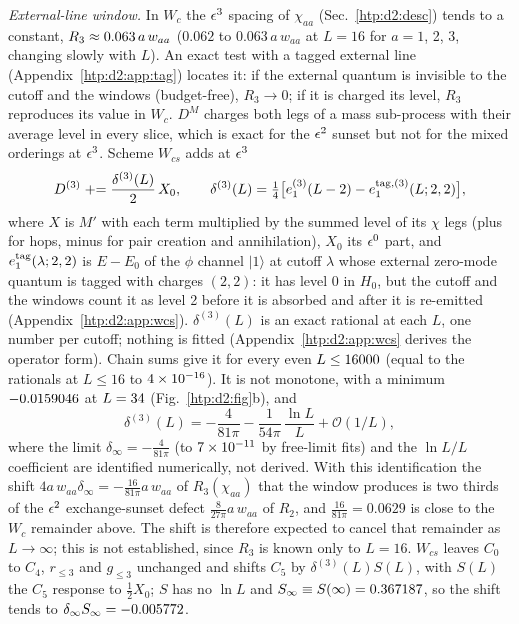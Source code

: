 \emph{External-line window.} In $W_c$ the $\epsilon^3$ spacing of $\chi_{aa}$ (Sec.~\ref{htp:d2:desc}) tends to a constant,
$R_3\approx0.063\,a\,w_{aa}$ ($0.062$ to $0.063\,a\,w_{aa}$ at $L=16$ for $a=1$, 2, 3, changing slowly with $L$). An exact test with a tagged external line (Appendix~\ref{htp:d2:app:tag}) locates it: if the external quantum is
invisible to the cutoff and the windows (budget-free), $R_3\to0$; if it is charged its level, $R_3$ reproduces its value
in $W_c$. $D^M$
charges both legs of a mass sub-process with their average level in every slice, which is exact for the $\epsilon^2$ sunset but not
for the mixed orderings at $\epsilon^3$. Scheme $W_{cs}$ adds at $\epsilon^3$
\begin{equation}
 D^{(3)}\mathrel{+}=\frac{\delta^{(3)}(L)}2\,X_0,\qquad \delta^{(3)}(L)=\tfrac14\big[e_1^{(3)}(L-2)-e_1^{{\rm tag},(3)}(L;2,2)\big] ,
 \label{htp:d2:eq:wcs}
\end{equation}
where $X$ is $M'$ with each term multiplied by the summed level of its $\chi$ legs (plus for hops, minus for pair
creation and annihilation), $X_0$ its $\epsilon^0$ part, and $e_1^{\rm tag}(\lambda;2,2)$ is $E-E_0$ of the $\phi$ channel $|1\rangle$
at cutoff $\lambda$ whose external zero-mode quantum is tagged with charges $(2,2)$: it has level 0 in $H_0$, but the cutoff
and the windows count it as level 2 before it is absorbed and after it is re-emitted (Appendix~\ref{htp:d2:app:wcs}). $\delta^{(3)}(L)$ is an exact rational at each $L$, one number per cutoff; nothing is
fitted (Appendix~\ref{htp:d2:app:wcs} derives the operator form). Chain sums give it for every even $L\le16000$ (equal to the rationals at $L\le16$ to $4\times10^{-16}$).
It is not monotone, with a minimum $-0.0159046$ at $L=34$ (Fig.~\ref{htp:d2:fig}b), and
\begin{equation}
 \delta^{(3)}(L)=-\frac4{81\pi}-\frac1{54\pi}\,\frac{\ln L}L+\mathcal O(1/L) ,
 \label{htp:d2:eq:delta}
\end{equation}
where the limit $\delta_\infty=-\frac4{81\pi}$ (to $7\times10^{-11}$ by free-limit fits) and the $\ln L/L$ coefficient are
identified numerically, not derived. With this identification the shift $4a\,w_{aa}\delta_\infty=-\frac{16}{81\pi}a\,w_{aa}$
of $R_3(\chi_{aa})$ that the window produces is two thirds of the $\epsilon^2$ exchange-sunset defect $\frac{8}{27\pi}a\,w_{aa}$
of $R_2$, and $\frac{16}{81\pi}=0.0629$ is close to the $W_c$ remainder above. The shift is therefore expected to cancel
that remainder as $L\to\infty$; this is not established, since $R_3$ is known only to $L=16$. $W_{cs}$ leaves $C_0$ to
$C_4$, $r_{\le3}$ and $g_{\le3}$ unchanged and shifts $C_5$ by $\delta^{(3)}(L)S(L)$, with $S(L)$ the $C_5$ response to
$\frac12X_0$; $S$ has no $\ln L$ and $S_\infty\equiv S(\infty)=0.367187$, so the shift tends to
$\delta_\infty S_\infty=-0.005772$.

